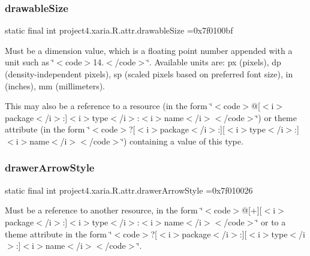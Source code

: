 \subsubsection{\texorpdfstring{drawable\+Size}{drawableSize}}
{\footnotesize\ttfamily static final int project4.\+xaria.\+R.\+attr.\+drawable\+Size =0x7f0100bf\hspace{0.3cm}{\ttfamily [static]}}

Must be a dimension value, which is a floating point number appended with a unit such as \char`\"{}$<$code$>$14.\+5sp$<$/code$>$\char`\"{}. Available units are\+: px (pixels), dp (density-\/independent pixels), sp (scaled pixels based on preferred font size), in (inches), mm (millimeters). 

This may also be a reference to a resource (in the form \char`\"{}$<$code$>$@\mbox{[}$<$i$>$package$<$/i$>$\+:\mbox{]}$<$i$>$type$<$/i$>$\+:$<$i$>$name$<$/i$>$$<$/code$>$\char`\"{}) or theme attribute (in the form \char`\"{}$<$code$>$?\mbox{[}$<$i$>$package$<$/i$>$\+:\mbox{]}\mbox{[}$<$i$>$type$<$/i$>$\+:\mbox{]}$<$i$>$name$<$/i$>$$<$/code$>$\char`\"{}) containing a value of this type. \mbox{\label{classproject4_1_1xaria_1_1R_1_1attr_aa885f069e272d2543443cc40aa3798bd}} 
\subsubsection{\texorpdfstring{drawer\+Arrow\+Style}{drawerArrowStyle}}
{\footnotesize\ttfamily static final int project4.\+xaria.\+R.\+attr.\+drawer\+Arrow\+Style =0x7f010026\hspace{0.3cm}{\ttfamily [static]}}

Must be a reference to another resource, in the form \char`\"{}$<$code$>$@\mbox{[}+\mbox{]}\mbox{[}$<$i$>$package$<$/i$>$\+:\mbox{]}$<$i$>$type$<$/i$>$\+:$<$i$>$name$<$/i$>$$<$/code$>$\char`\"{} or to a theme attribute in the form \char`\"{}$<$code$>$?\mbox{[}$<$i$>$package$<$/i$>$\+:\mbox{]}\mbox{[}$<$i$>$type$<$/i$>$\+:\mbox{]}$<$i$>$name$<$/i$>$$<$/code$>$\char`\"{}. \mbox{\label{classproject4_1_1xaria_1_1R_1_1attr_a0a7dc0229f535ad81ecb44f0614dda82}} 

